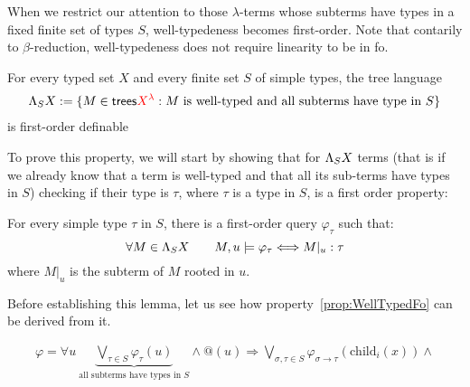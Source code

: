 When we restrict our attention to those $\lambda$-terms whose subterms have types in a fixed finite set of types $S$, well-typedeness becomes first-order. Note that contarily to $\beta$-reduction, well-typedeness does not require linearity to be in fo.

\begin{proposition}\label{prop:WellTypedFo}
    For every typed set $X$ and every finite set $S$ of simple types, the tree language 
    \begin{align*}
    \Lambda_{S} X  := \{ M \in \mathsf {trees} {\color{red}{X^\lambda}} : \text{$M$ is well-typed and all subterms have type in $S$}\}
    \end{align*}
    is first-order definable 
\end{proposition}

To prove this property, we will start by showing that for $\Lambda_{S} X$ terms (that is if we already know that a term is well-typed and that all its sub-terms have types in $S$) checking if their type is $\tau$, where $\tau$ is a type in $S$, is a first order property:
\begin{lemma}\label{lem:IsTypeTauFo}
For every simple type $\tau$ in $S$, there is a first-order query $\varphi_\tau$ such that:
$$ \forall M\in \Lambda_{S} X \qquad M,u \models \varphi_\tau \Longleftrightarrow M|_u:\tau$$
where $M|_u$ is the subterm of $M$ rooted in $u$. 
\end{lemma}
Before establishing this lemma, let us see how property~\ref{prop:WellTypedFo} can be derived from it.

\begin{align*}
\varphi=\forall u \ \underbrace{\bigvee_{\tau\in S} \varphi_\tau (u)}_{\text{all subterms have types in $S$}} \wedge \text{@}(u) \Rightarrow \bigvee_{\sigma,\tau\in S} \varphi_{\sigma\rightarrow\tau} (\mathrm{child}_i(x))\wedge 
\end{align*}

